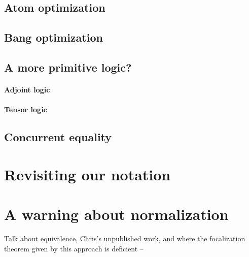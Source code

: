 \subsection{Atom optimization}

\subsection{Bang optimization}

\subsection{A more primitive logic?}

\paragraph{Adjoint logic}

\paragraph{Tensor logic}

\subsection{Concurrent equality}

\section{Revisiting our notation}
\label{sec:linnote}

\section{A warning about normalization}
\label{sec:warning}

Talk about equivalence, Chris's unpublished work, and where
the focalization theorem given by this approach is deficient -- 